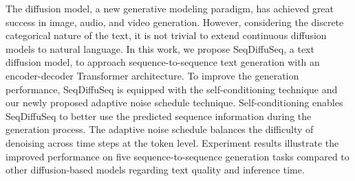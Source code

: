 The diffusion model, a new generative modeling paradigm, has achieved great success in image, audio, and video generation. However, considering the discrete categorical nature of the text, it is not trivial to extend continuous diffusion models to natural language.  In this work, we propose SeqDiffuSeq, a text diffusion model, to approach sequence-to-sequence text generation with an encoder-decoder Transformer architecture. To improve the generation performance, SeqDiffuSeq is equipped with the self-conditioning technique and our newly proposed adaptive noise schedule technique.  Self-conditioning enables SeqDiffuSeq to better use the predicted sequence information during the generation process. The adaptive noise schedule balances the difficulty of denoising across time steps at the token level. Experiment results illustrate the improved performance on five sequence-to-sequence generation tasks compared to other diffusion-based models regarding text quality and inference time.